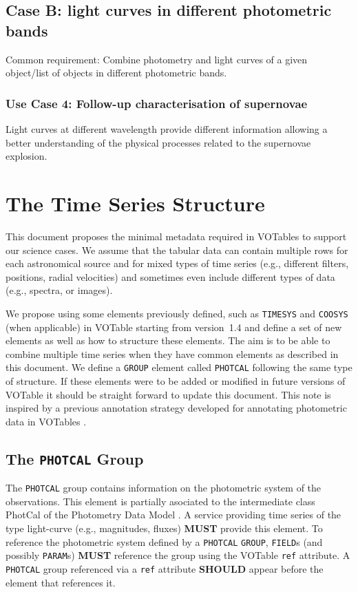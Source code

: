 \documentclass[11pt,a4paper]{ivoa}
\let\fg=\color
\def\attr#1{{\tt{\fg{DarkRed}#1}}}
\def\elem#1{{\tt{\fg{DarkRed}#1}}}
\begin{document}
\subsection{Case B: light curves in different photometric bands}
Common requirement: Combine photometry and light curves of a given object/list of objects in different photometric bands.

\subsubsection{Use Case 4: Follow-up characterisation of supernovae}
Light curves at different wavelength provide different information allowing a better understanding of the physical processes related to the supernovae explosion.

\section{The Time Series Structure}
\label{elem:TIMESERIES}
This document proposes the minimal metadata required in VOTables to support our science cases. We assume that the tabular data can contain multiple rows for each astronomical source and for mixed types of time series (e.g., different filters, positions, radial velocities) and sometimes even include different types of data (e.g., spectra, or images). 


We propose using some elements previously defined, such as \elem{TIMESYS} and \elem{COOSYS} (when applicable) in VOTable starting from version~1.4 \citep{2019ivoa.spec.1021O} and define a set of new elements as well as how to structure these elements. The aim is to be able to combine multiple time series when they have common elements as described in this document. We define a \elem{GROUP} element called \elem{PHOTCAL} following the same type of structure. If these elements were to be added or modified in future versions of VOTable it should be straight forward to update this document. This note is inspired by a previous annotation strategy developed for annotating photometric data in VOTables \citep{note:seb2010-1}.

%
%

\subsection{The \texttt{PHOTCAL} Group}
The \texttt{PHOTCAL} group contains information on the photometric system of the observations. This element is partially asociated to the intermediate class PhotCal of the Photometry Data Model \citep{2013ivoa.spec.1005S}. A service providing time series of the type light-curve (e.g., magnitudes, fluxes) \textbf{MUST} provide this element. To reference the photometric system defined by a \texttt{PHOTCAL} \elem{GROUP}, \elem{FIELD}s (and possibly \elem{PARAM}s) \textbf{MUST} reference the group using the VOTable \attr{ref} attribute. A \texttt{PHOTCAL} group referenced via a \attr{ref} attribute \textbf{SHOULD} appear before the element that references it. 
\end{document}
